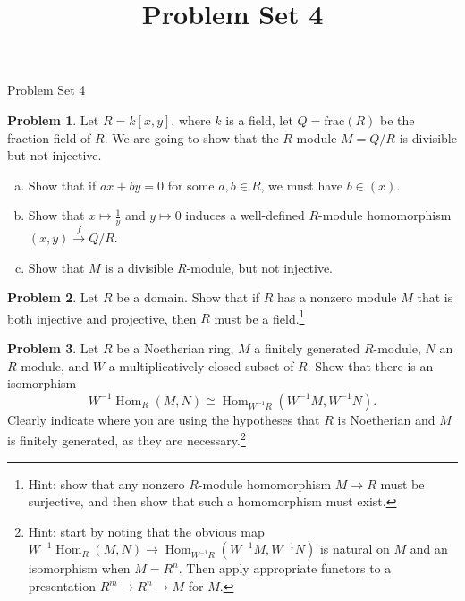 \documentclass[11pt]{article}
\title{}
\date{\vspace{-0.5in}}
\title{Problem Set 4}
\DeclareMathOperator{\Hom}{Hom}
\theoremstyle{definition}
\newtheorem{problem}{Problem}
\begin{document}
\thispagestyle{fancy}
\pagestyle{fancy}


\begin{center}
	{\LARGE Problem Set 4}
\end{center}



\begin{problem}
	Let $R=k[x,y]$, where $k$ is a field, let $Q = \textrm{frac}(R)$ be the fraction field of $R$. We are going to show that the $R$-module $M = Q/R$ is divisible but not injective.
	\begin{enumerate}[a)]
		\item Show that if $ax + by = 0$ for some $a, b \in R$, we must have $b \in (x)$.
		\item Show that $x \mapsto \frac{1}{y}$ and $y \mapsto 0$ induces a well-defined $R$-module homomorphism $(x,y) \xrightarrow{\, f \,} Q/R$.
		\item Show that $M$ is a divisible $R$-module, but not injective.
	\end{enumerate}
\end{problem}



\vfill

\begin{problem}
	Let $R$ be a domain. Show that if $R$ has a nonzero module $M$ that is both injective and projective, then $R$ must be a field.\footnote{Hint: show that any nonzero $R$-module homomorphism $M \longrightarrow R$ must be surjective, and then show that such a homomorphism must exist.}
\end{problem}



\vfill


\begin{problem}
	Let $R$ be a Noetherian ring, $M$ a finitely generated $R$-module, $N$ an $R$-module, and $W$ a multiplicatively closed subset of $R$. Show that there is an isomorphism
	$$W^{-1} \Hom_R(M,N) \cong \Hom_{W^{-1} R}(W^{-1}M,W^{-1}N).$$
	Clearly indicate where you are using the hypotheses that $R$ is Noetherian and $M$ is finitely generated, as they are necessary.\footnote{Hint: start by noting that the obvious map $W^{-1} \Hom_R(M,N) \longrightarrow \Hom_{W^{-1} R}(W^{-1}M,W^{-1}N)$ is natural on $M$ and an isomorphism when $M = R^n$. Then apply appropriate functors to a presentation $R^m \longrightarrow R^n \longrightarrow M$ for $M$.}
\end{problem}
\end{document}
